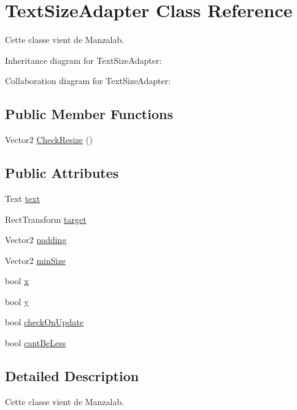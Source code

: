 \hypertarget{class_text_size_adapter}{}\section{Text\+Size\+Adapter Class Reference}
\label{class_text_size_adapter}


Cette classe vient de Manzalab.  




Inheritance diagram for Text\+Size\+Adapter\+:


Collaboration diagram for Text\+Size\+Adapter\+:
\subsection*{Public Member Functions}
\begin{DoxyCompactItemize}
\item 
Vector2 \hyperlink{class_text_size_adapter_a5999c82c6a5db62e155db48f5855fab9}{Check\+Resize} ()
\end{DoxyCompactItemize}
\subsection*{Public Attributes}
\begin{DoxyCompactItemize}
\item 
Text \hyperlink{class_text_size_adapter_abc0d2b31b9865648e28749e2691f8265}{text}
\item 
Rect\+Transform \hyperlink{class_text_size_adapter_a09dae03f6d77bfb5891fe1f3d386656b}{target}
\item 
Vector2 \hyperlink{class_text_size_adapter_ac90783f6319a383caa95ecf2fe6d4a21}{padding}
\item 
Vector2 \hyperlink{class_text_size_adapter_ae49dba7c24524195eda709c634f8bbe8}{min\+Size}
\item 
bool \hyperlink{class_text_size_adapter_a2b57860b896149bf19c5bb08f1b49132}{x}
\item 
bool \hyperlink{class_text_size_adapter_abd34c0121bd74a15606655584f4662f6}{y}
\item 
bool \hyperlink{class_text_size_adapter_aeccc5b0bd72e58b9dffdd6e48cf0d642}{check\+On\+Update}
\item 
bool \hyperlink{class_text_size_adapter_a4e9deafc347361030e3c0c91917549c1}{cant\+Be\+Less}
\end{DoxyCompactItemize}


\subsection{Detailed Description}
Cette classe vient de Manzalab. 



